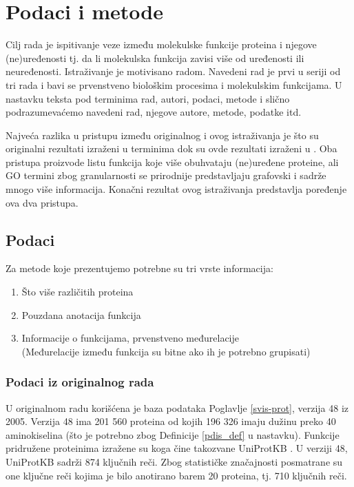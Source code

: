 
\chapter{Podaci i metode} %

\label{Podaci i metode} %

Cilj rada je ispitivanje veze između molekulske funkcije proteina i njegove
(ne)uređenosti tj. da li molekulska funkcija zavisi više od uređenosti ili
neuređenosti. Istraživanje je motivisano radom\parencite{Xie2007}. Navedeni rad je prvi u seriji od 
tri rada i bavi se prvenstveno biološkim procesima i molekulskim funkcijama.
U nastavku teksta pod terminima  rad, autori, podaci, metode i slično 
podrazumevaćemo navedeni rad, njegove autore, metode, podatke itd.

Najveća razlika u pristupu između originalnog i ovog istraživanja je što su
originalni rezultati izraženi u terminima  dok su ovde
rezultati izraženi u . Oba pristupa proizvode listu
funkcija koje više obuhvataju (ne)uređene proteine, ali GO termini zbog
granularnosti se prirodnije predstavljaju grafovski i sadrže mnogo više
informacija. Konačni rezultat ovog istraživanja predstavlja poređenje ova dva
pristupa.


\section {Podaci}

Za metode koje prezentujemo potrebne su tri vrste informacija:
\begin{enumerate}
  \item Što više različitih proteina
  \item Pouzdana anotacija funkcija
  \item Informacije o funkcijama, prvenstveno međurelacije\\
    (Međurelacije između funkcija su bitne  ako ih je potrebno grupisati)
\end{enumerate}


\subsection{Podaci iz originalnog rada}

U originalnom radu \parencite{Xie2007} korišćena je  baza podataka 
\keyword{\swissprot} Poglavlje \ref{svis-prot}, verzija 48 iz 2005.
Verzija 48 ima 201 560 proteina od kojih 196 326 imaju dužinu preko 40
aminokiselina (što je potrebno zbog Definicije \ref{pdis_def} u nastavku). Funkcije
pridružene proteinima izražene su 
 koga čine takozvane UniProtKB 
. U verziji 48, UniProtKB sadrži 874 ključnih reči.  Zbog
statističke značajnosti posmatrane su one ključne reči kojima je bilo anotirano
barem 20 proteina, tj. 710 ključnih reči.

